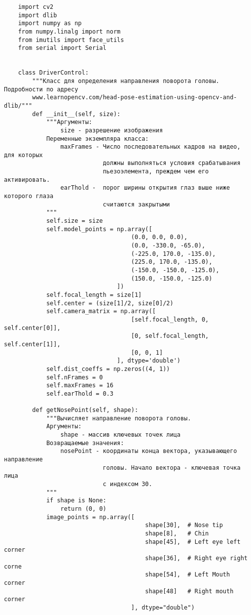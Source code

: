 \begin{verbatim}
    import cv2
    import dlib
    import numpy as np
    from numpy.linalg import norm
    from imutils import face_utils
    from serial import Serial


    class DriverControl:
        """Класс для определения направления поворота головы. Подробности по адресу
        www.learnopencv.com/head-pose-estimation-using-opencv-and-dlib/"""
        def __init__(self, size):
            """Аргументы:
                size - разрешение изображения
            Переменные экземпляра класса:
                maxFrames - Число последовательных кадров на видео, для которых
                            должны выполняться условия cрабатывания
                            пьезоэлемента, преждем чем его активировать.
                earThold -  порог ширины открытия глаз выше ниже которого глаза
                            считаются закрытыми
            """
            self.size = size
            self.model_points = np.array([
                                    (0.0, 0.0, 0.0),
                                    (0.0, -330.0, -65.0),
                                    (-225.0, 170.0, -135.0),
                                    (225.0, 170.0, -135.0),
                                    (-150.0, -150.0, -125.0),
                                    (150.0, -150.0, -125.0)
                                ])
            self.focal_length = size[1]
            self.center = (size[1]/2, size[0]/2)
            self.camera_matrix = np.array([
                                    [self.focal_length, 0, self.center[0]],
                                    [0, self.focal_length, self.center[1]],
                                    [0, 0, 1]
                                ], dtype='double')
            self.dist_coeffs = np.zeros((4, 1))
            self.nFrames = 0
            self.maxFrames = 16
            self.earThold = 0.3

        def getNosePoint(self, shape):
            """Вычисляет направление поворота головы.
            Аргументы:
                shape - массив ключевых точек лица
            Возвращаемые значения:
                nosePoint - координаты конца вектора, указывающего направление
                            головы. Начало вектора - ключевая точка лица
                            с индексом 30.
            """
            if shape is None:
                return (0, 0)
            image_points = np.array([
                                        shape[30], 	# Nose tip
                                        shape[8],  	# Chin
                                        shape[45], 	# Left eye left corner
                                        shape[36], 	# Right eye right corne
                                        shape[54], 	# Left Mouth corner
                                        shape[48]  	# Right mouth corner
                                    ], dtype="double")


\end{verbatim}
